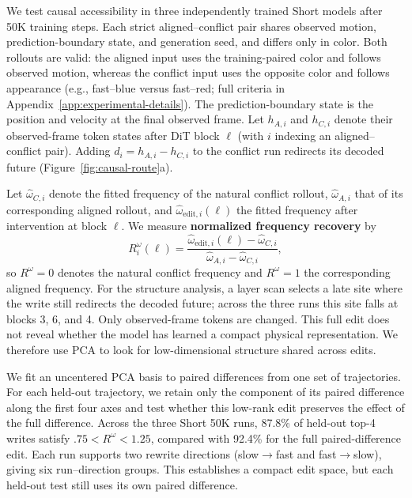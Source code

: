 \documentclass{article}
\newcommand{\resultlead}[1]{\par\noindent{\bfseries #1}\hspace{0.35em}}
\begin{document}
We test causal accessibility in three independently trained Short models after 50K training steps. Each
strict aligned--conflict pair shares observed motion, prediction-boundary state,
and generation seed, and differs only in color. Both rollouts are valid: the
aligned input uses the training-paired color and follows observed motion,
whereas the conflict input uses the opposite color and follows appearance
(e.g., fast--blue versus fast--red; full criteria in
Appendix~\ref{app:experimental-details}). The prediction-boundary state is the
position and velocity at the final observed frame. Let $h_{A,i}$ and
$h_{C,i}$ denote their observed-frame token states after DiT block $\ell$
(with $i$ indexing an aligned--conflict pair).
Adding $d_i=h_{A,i}-h_{C,i}$ to the conflict run redirects its decoded future
(Figure~\ref{fig:causal-route}a).

Let $\hat\omega_{C,i}$ denote the fitted frequency of the natural conflict
rollout, $\hat\omega_{A,i}$ that of its corresponding aligned rollout, and
$\hat\omega_{\mathrm{edit},i}(\ell)$ the fitted frequency after intervention at
block $\ell$. We measure \textbf{normalized frequency recovery} by
\[
R_i^\omega(\ell)=
\frac{\hat\omega_{\mathrm{edit},i}(\ell)-\hat\omega_{C,i}}
     {\hat\omega_{A,i}-\hat\omega_{C,i}},
\]
so $R^\omega=0$ denotes the natural conflict frequency and $R^\omega=1$ the
corresponding aligned frequency. For the structure analysis, a layer scan
selects a late site where the write still redirects the decoded future; across
the three runs this site falls at blocks 3, 6, and 4. Only observed-frame tokens are
changed. This full edit does not reveal whether the model has learned a compact
physical representation. We therefore use PCA to look for low-dimensional
structure shared across edits.

\resultlead{Four coordinates retain nearly the full effect.} We fit an uncentered
PCA basis to paired differences from one set of trajectories. For each held-out
trajectory, we retain only the component of its paired difference along the
first four axes and test whether this low-rank edit preserves the effect of the
full difference. Across the three Short 50K runs, 87.8\% of held-out top-4 writes satisfy
$.75<R^\omega<1.25$, compared with 92.4\% for the full paired-difference edit.
Each run supports two rewrite directions (slow$\to$fast and fast$\to$slow), giving
six run--direction groups. This establishes a compact edit space, but each
held-out test still uses its own paired difference.
\end{document}
